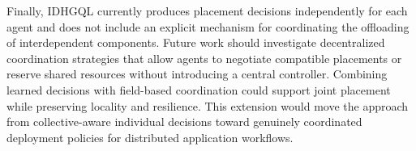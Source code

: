Finally, IDHGQL currently produces placement decisions independently for each
agent and does not include an explicit mechanism for coordinating the offloading
of interdependent components.
Future work should investigate decentralized coordination strategies that allow
agents to negotiate compatible placements or reserve shared resources without
introducing a central controller.
Combining learned decisions with field-based coordination could support joint
placement while preserving locality and resilience.
This extension would move the approach from collective-aware individual decisions
toward genuinely coordinated deployment policies for distributed application
workflows.
